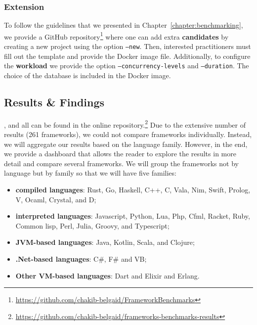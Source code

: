 \subsubsection{Extension}
To follow the guidelines that we presented in Chapter~\ref{chapter:benchmarking}, we provide a GitHub repository\footnote{\url{https://github.com/chakib-belgaid/FrameworkBenchmarks}} where one can add extra \textbf{candidates} by creating a new project using the option \texttt{--new}.
Then, interested practitioners must fill out the template and provide the Docker image file.
Additionally, to configure the \textbf{workload} we provide the option \texttt{--concurrency-levels} and \texttt{--duration}.
The choice of the database is included in the Docker image.

\subsection{Results \& Findings}


, and all can be found in the online repository.\footnote{\url{https://github.com/chakib-belgaid/frameworks-benchmarks-results}}
Due to the extensive number of results (261 frameworks), we could not compare frameworks individually. Instead, we will aggregate our results based on the language family. However, in the end, we provide a dashboard that allows the reader to explore the results in more detail and compare several frameworks.
We will group the frameworks not by language but by family so that we will have five families:
\begin{itemize}
    \item \textbf{compiled languages}: Rust, Go, Haskell, C++, C, Vala, Nim, Swift, Prolog, V, Ocaml, Crystal, and D;
    \item \textbf{interpreted languages}: Javascript, Python, Lua, Php, Cfml, Racket, Ruby, Common lisp, Perl, Julia, Groovy, and Typescript;
    \item \textbf{JVM-based languages}: Java, Kotlin, Scala, and Clojure;
    \item \textbf{.Net-based languages}: C\#, F\# and VB;
    \item \textbf{Other VM-based languages}: Dart and Elixir and Erlang.
\end{itemize}

